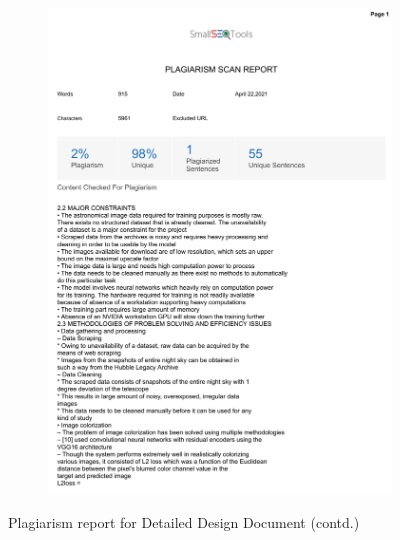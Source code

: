 \documentclass[oneside,a4paper,12pt]{report}
\begin{document}
\begin{appendices}
\begin{figure}
\begin{subfigure}[H]{\textwidth}
    	\includegraphics[scale=0.7, page=2]{plagiarism/problem_definition&scope_2.pdf}
    \end{subfigure}
    \caption{Plagiarism report for Detailed Design Document (contd.)}
    \label{PlagiarismDesign_2}
\end{figure}


\end{appendices}
\end{document}
